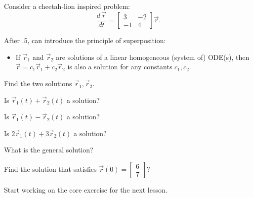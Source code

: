 \question \label{sys:2real}
Consider a cheetah-lion inspired problem:
$$
\frac{d \,\vec{r}}{dt} = \begin{bmatrix} 3 & -2 \\ -1 & 4\end{bmatrix} \vec{r}.
$$
\begin{annotation}
\begin{notes}
	After .5, can introduce the principle of superposition:
	\begin{itemize}
		\item If $\vec{r}_1$ and $\vec{r}_2$ are solutions of a linear homogeneous (system of) ODE(s), then $\vec{r} = c_1 \vec{r}_1 + c_2\vec{r}_2$ is also a solution for any constants $c_1,c_2$.
	\end{itemize}
\end{notes}	
\end{annotation}
\begin{parts}
	\item Find the two solutions $\vec{r}_1, \vec{r}_2$.
	\item Is $\vec{r}_1(t) + \vec{r}_2(t)$ a solution?
	\item Is $\vec{r}_1(t) - \vec{r}_2(t)$ a solution?
	\item Is $2\vec{r}_1(t) + 3\vec{r}_2(t)$ a solution?
	\item What is the general solution?
	\item Find the solution that satisfies $\vec{r}(0) = \begin{bmatrix} 6 \\ 7\end{bmatrix}$?
\end{parts}
\begin{annotation}
\begin{notes}
	Start working on the core exercise for the next lesson.
\end{notes}	
\end{annotation}


